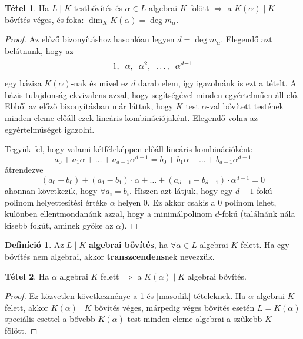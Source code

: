 \documentclass[12pt]{book}
\theoremstyle{plain} %
\theoremstyle{definition} %
\newtheorem{defi/}{Definíció}[section]
\newenvironment{defi}
  {\renewcommand{\qedsymbol}{$\clubsuit$}%
   \pushQED{\qed}\begin{defi/}}
  {\popQED\end{defi/}}
\newtheorem{theo/}{Tétel}[section]
\newenvironment{theo}
  {\renewcommand{\qedsymbol}{$\clubsuit$}%
   \pushQED{\qed}\begin{theo/}}
  {\popQED\end{theo/}}
\theoremstyle{remark}
\renewcommand\qedsymbol{$\blacksquare$}
\numberwithin{equation}{section}  %
\begin{document}
	\begin{theo}\label{elso}
		Ha $L\mid K$ testbővítés és $\alpha\in L$ algebrai $K$ fölött $\Rightarrow$ a $K(\alpha) \mid K$ bővítés véges, és foka: $\dim_K K(\alpha) = \deg m_\alpha$.
	\end{theo}
	\begin{proof}
		Az előző bizonyításhoz hasonlóan legyen $d = \deg m_\alpha$. Elegendő azt belátnunk, hogy az
		\[ 1, \hspace{2mm} \alpha, \hspace{2mm} \alpha^2, \hspace{2mm} \ldots, \hspace{2mm} \alpha^{d-1}  \]
		egy bázisa $K(\alpha)$-nak és mivel ez $d$ darab elem, így igazolnánk is ezt a tételt. A bázis tulajdonság ekvivalens azzal, hogy segítségével minden egyértelműen áll elő. Ebből az előző bizonyításban már láttuk, hogy $K$ test $\alpha$-val bővített testének minden eleme előáll ezek lineáris kombinációjaként. Elegendő volna az egyértelműséget igazolni.
		
		Tegyük fel, hogy valami kétféleképpen előáll lineáris kombinációként:
		\[ a_0 + a_1\alpha + \ldots + a_{d-1} \alpha^{d-1} = b_0 + b_1\alpha + \ldots + b_{d-1} \alpha^{d-1}  \]
		átrendezve
		\[ (a_0-b_0) + (a_1-b_1) \cdot \alpha + \ldots + (a_{d-1}-b_{d-1})\cdot \alpha^{d-1} = 0 \]
		ahonnan következik, hogy $\forall a_i = b_i$. Hiszen azt látjuk, hogy egy $d-1$ fokú polinom helyettesítési értéke $\alpha$ helyen $0$. Ez akkor csakis a $0$ polinom lehet, különben ellentmondanánk azzal, hogy a minimálpolinom $d$-fokú (találnánk nála kisebb fokút, aminek gyöke az $\alpha$).
	\end{proof}

	\begin{defi}
		Az $L\mid K$ \textbf{algebrai bővítés}, ha $\forall \alpha \in L$ algebrai $K$ felett. Ha egy bővítés nem algebrai, akkor \textbf{transzcendens}nek nevezzük.
	\end{defi}

	\begin{theo}
		Ha $\alpha$ algebrai $K$ felett $\Rightarrow$ a $K(\alpha)\mid K$ algebrai bővítés.
	\end{theo}

	\begin{proof}
		Ez közvetlen következménye a \ref{elso} és \ref{masodik} tételeknek. Ha $\alpha$ algebrai $K$ felett, akkor $K(\alpha)\mid K$ bővítés véges, márpedig véges bővítés esetén $L=K(\alpha)$ speciális esettel a bővebb $K(\alpha)$ test minden eleme algebrai a szűkebb $K$ fölött.
	\end{proof}
	
\end{document}
